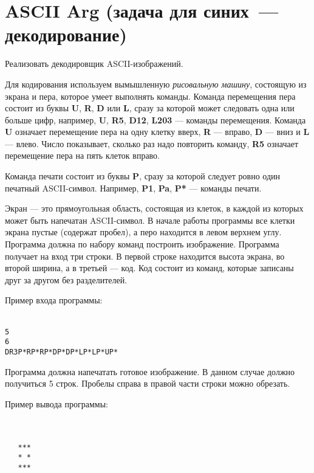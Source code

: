 \documentclass[a4paper,10pt]{article}
\begin{document}
\section*{ASCII Arg (задача для синих~--- декодирование)}

Реализовать декодировщик ASCII-изображений.

Для кодирования используем вымышленную {\em рисовальную машину}, состоящую из экрана и пера, которое умеет выполнять команды.
Команда перемещения пера состоит из буквы \textbf{U}, \textbf{R}, \textbf{D} или \textbf{L}, сразу за которой может следовать одна или больше цифр, например, \textbf{U}, \textbf{R5}, \textbf{D12}, \textbf{L203} — команды перемещения.
Команда \textbf{U} означает перемещение пера на одну клетку вверх, \textbf{R} — вправо, \textbf{D} — вниз и \textbf{L} — влево.
Число показывает, сколько раз надо повторить команду, \textbf{R5} означает перемещение пера на пять клеток вправо.

Команда печати состоит из буквы \textbf{P}, сразу за которой следует ровно один печатный ASCII-символ.
Например, \textbf{P1}, \textbf{Pa}, \textbf{P*} — команды печати.

Экран — это прямоугольная область, состоящая из клеток, в каждой из которых может быть напечатан ASCII-символ.
В начале работы программы все клетки экрана пустые (содержат пробел), а перо находится в левом верхнем углу.
Программа должна по набору команд построить изображение.
Программа получает на вход три строки.
В первой строке находится высота экрана, во второй ширина, а в третьей — код.
Код состоит из команд, которые записаны друг за другом без разделителей.

Пример входа программы:

\texttt{ \\
5\\
6\\
DR3P*RP*RP*DP*DP*LP*LP*UP*}

Программа должна напечатать готовое изображение.
В данном случае должно получиться 5 строк.
Пробелы справа в правой части строки можно обрезать.

Пример вывода программы:


\texttt{ \\
\\
\ \ \ ***\\
\ \ \ *\ *\\
\ \ \ ***\\
\\
}
\end{document}
